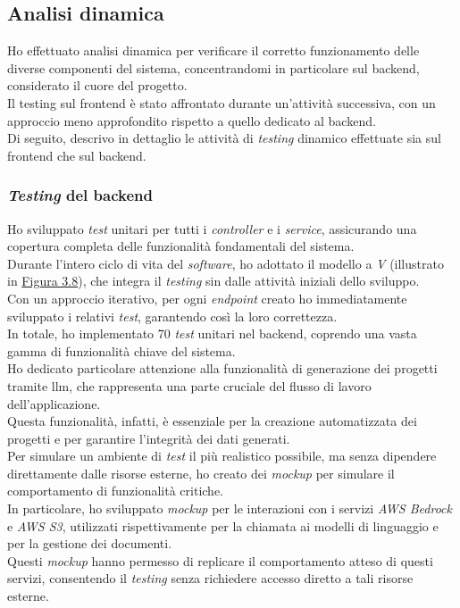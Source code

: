 \subsection{Analisi dinamica}
\label{subsec:analisi-dinamica}


Ho effettuato analisi dinamica per verificare il corretto funzionamento delle diverse componenti del sistema, concentrandomi in particolare sul \gls{backend}, considerato il cuore del progetto. \\
Il testing sul \gls{frontend} è stato affrontato durante un'attività successiva, con un approccio meno approfondito rispetto a quello dedicato al \gls{backend}.\\

\noindent Di seguito, descrivo in dettaglio le attività di \textit{testing} dinamico effettuate sia sul \gls{frontend} che sul \gls{backend}.
\pagebreak
\subsubsection{\textit{Testing} del \gls{backend}}

Ho sviluppato \textit{test} unitari per tutti i \textit{controller} e i \textit{service}, assicurando una copertura completa delle funzionalità fondamentali del sistema.\\

\noindent Durante l'intero ciclo di vita del \textit{software}, ho adottato il modello a \textit{V} (illustrato in {\hyperref[fig:v-model]{Figura 3.8}}), che integra il \textit{testing} sin dalle attività iniziali dello sviluppo. \\
Con un approccio iterativo, per ogni \textit{endpoint} creato ho immediatamente sviluppato i relativi \textit{test}, garantendo così la loro correttezza.\\

\noindent In totale, ho implementato 70 \textit{test} unitari nel \gls{backend}, coprendo una vasta gamma di funzionalità chiave del sistema.\\
Ho dedicato particolare attenzione alla funzionalità di generazione dei progetti tramite \gls{llm}, che rappresenta una parte cruciale del flusso di lavoro dell'applicazione.\\
 Questa funzionalità, infatti, è essenziale per la creazione automatizzata dei progetti e per garantire l'integrità dei dati generati.\\

\noindent Per simulare un ambiente di \textit{test} il più realistico possibile, ma senza dipendere direttamente dalle risorse esterne, ho creato dei \textit{mockup} per simulare il comportamento di funzionalità critiche.\\
In particolare, ho sviluppato \textit{mockup} per le interazioni con i servizi \textit{AWS Bedrock} e \textit{AWS S3}, utilizzati rispettivamente per la chiamata ai modelli di linguaggio e per la gestione dei documenti.\\
Questi \textit{mockup} hanno permesso di replicare il comportamento atteso di questi servizi, consentendo il \textit{testing} senza richiedere accesso diretto a tali risorse esterne.\\

